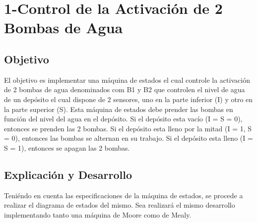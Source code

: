 \chapter{1-Control de la Activaci\'on de 2 Bombas de Agua}
\section{Objetivo}
El objetivo es implementar una máquina de estados el cual controle la activación de 2 bombas de agua denominados com B1 y B2 que controlen el nivel de agua de un dep\'osito el cual dispone de 2 sensores, uno en la parte inferior (I) y otro en la parte superior (S).
Esta m\'aquina de estados debe prender las bombas en función del nivel del agua en el dep\'osito.
Si el dep\'osito esta vac\'io (I = S = 0), entonces se prenden las 2 bombas.
Si el dep\'osito esta lleno por la mitad (I = 1, S = 0), entonces las bombas se alternan en su trabajo.
Si el dep\'osito esta lleno (I = S = 1), entonces se apagan las 2 bombas.

\section{Explicaci\'on y Desarrollo}
Teni\'endo en cuenta las especificaciones de la m\'aquina de estados, se procede a realizar el diagrama de estados del mismo. Sea realizará el mismo desarrollo implementando tanto una m\'aquina de Moore como de Mealy.

